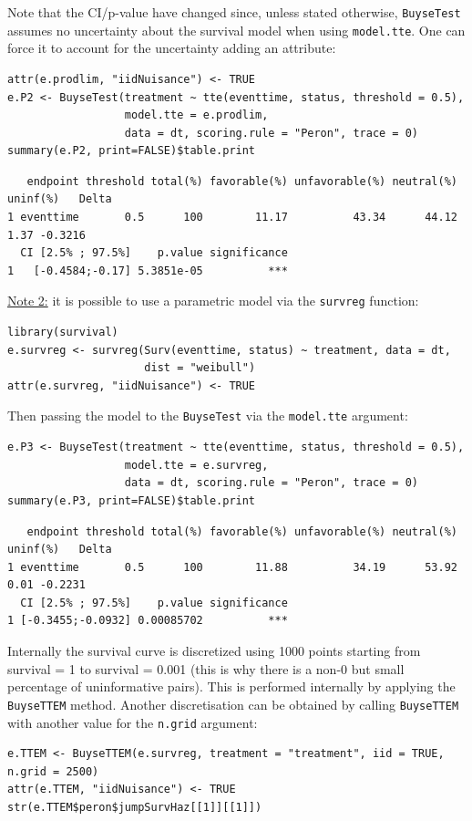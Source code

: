 \documentclass[12pt]{article}
\begin{document}
Note that the CI/p-value have changed since, unless stated otherwise,
\texttt{BuyseTest} assumes no uncertainty about the survival model when using
\texttt{model.tte}. One can force it to account for the uncertainty adding an attribute:
\lstset{language=r,label= ,caption= ,captionpos=b,numbers=none}
\begin{lstlisting}
attr(e.prodlim, "iidNuisance") <- TRUE
e.P2 <- BuyseTest(treatment ~ tte(eventtime, status, threshold = 0.5),
                  model.tte = e.prodlim,
                  data = dt, scoring.rule = "Peron", trace = 0)
summary(e.P2, print=FALSE)$table.print
\end{lstlisting}

\begin{verbatim}
   endpoint threshold total(%) favorable(%) unfavorable(%) neutral(%) uninf(%)   Delta
1 eventtime       0.5      100        11.17          43.34      44.12     1.37 -0.3216
  CI [2.5% ; 97.5%]    p.value significance
1   [-0.4584;-0.17] 5.3851e-05          ***
\end{verbatim}


\bigskip

\uline{Note 2:} it is possible to use a parametric model via the \texttt{survreg} function:
\lstset{language=r,label= ,caption= ,captionpos=b,numbers=none}
\begin{lstlisting}
library(survival)
e.survreg <- survreg(Surv(eventtime, status) ~ treatment, data = dt, 
                     dist = "weibull")
attr(e.survreg, "iidNuisance") <- TRUE
\end{lstlisting}

Then passing the model to the \texttt{BuyseTest} via the \texttt{model.tte} argument:
\lstset{language=r,label= ,caption= ,captionpos=b,numbers=none}
\begin{lstlisting}
e.P3 <- BuyseTest(treatment ~ tte(eventtime, status, threshold = 0.5),
                  model.tte = e.survreg,
                  data = dt, scoring.rule = "Peron", trace = 0)
summary(e.P3, print=FALSE)$table.print
\end{lstlisting}
\begin{verbatim}
   endpoint threshold total(%) favorable(%) unfavorable(%) neutral(%) uninf(%)   Delta
1 eventtime       0.5      100        11.88          34.19      53.92     0.01 -0.2231
  CI [2.5% ; 97.5%]    p.value significance
1 [-0.3455;-0.0932] 0.00085702          ***
\end{verbatim}


Internally the survival curve is discretized using 1000 points
starting from survival = 1 to survival = 0.001 (this is why there is a
non-0 but small percentage of uninformative pairs). This is performed
internally by applying the \texttt{BuyseTTEM} method. Another discretisation
can be obtained by calling \texttt{BuyseTTEM} with another value for the \texttt{n.grid} argument:
\lstset{language=r,label= ,caption= ,captionpos=b,numbers=none}
\begin{lstlisting}
e.TTEM <- BuyseTTEM(e.survreg, treatment = "treatment", iid = TRUE, n.grid = 2500)
attr(e.TTEM, "iidNuisance") <- TRUE
str(e.TTEM$peron$jumpSurvHaz[[1]][[1]])
\end{lstlisting}
\end{document}
